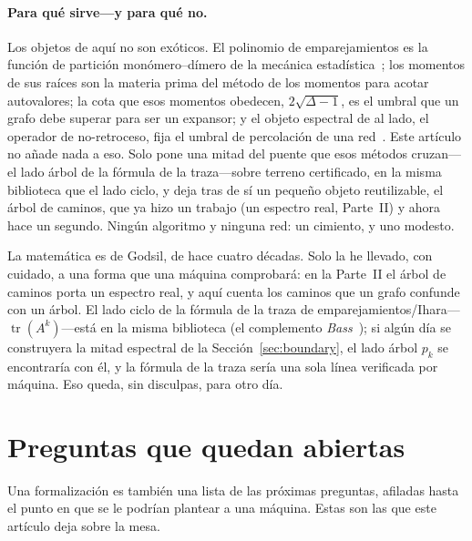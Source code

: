 \documentclass[11pt]{article}
\DeclareMathOperator{\tr}{tr}
\begin{document}
\paragraph{Para qu\'e sirve---y para qu\'e no.} Los objetos de aqu\'i no son ex\'oticos. El polinomio de
emparejamientos es la funci\'on de partici\'on mon\'omero--d\'imero de la mec\'anica
estad\'istica~\cite{HeilmannLieb}; los momentos de sus ra\'ices son la materia prima del m\'etodo de los
momentos para acotar autovalores; la cota que esos momentos obedecen, $2\sqrt{\Delta-1}$, es el umbral
que un grafo debe superar para ser un expansor; y el objeto espectral de al lado, el operador de
no-retroceso, fija el umbral de percolaci\'on de una red~\cite{Hashimoto,Bass}. Este art\'iculo no
a\~nade nada a eso. Solo pone una mitad del puente que esos m\'etodos cruzan---el lado \'arbol de la
f\'ormula de la traza---sobre terreno certificado, en la misma biblioteca que el lado ciclo, y deja tras
de s\'i un peque\~no objeto reutilizable, el \'arbol de caminos, que ya hizo un trabajo (un espectro
real, Parte~II) y ahora hace un segundo. Ning\'un algoritmo y ninguna red: un cimiento, y uno modesto.

La matem\'atica es de Godsil, de hace cuatro d\'ecadas. Solo la he llevado, con cuidado, a una forma que
una m\'aquina comprobar\'a: en la Parte~II el \'arbol de caminos porta un espectro real, y aqu\'i cuenta
los caminos que un grafo confunde con un \'arbol. El lado ciclo de la f\'ormula de la traza de
emparejamientos/Ihara---$\tr(A^k)$---est\'a en la misma biblioteca (el complemento \emph{Bass}~\cite{Bass});
si alg\'un d\'ia se construyera la mitad espectral de la Secci\'on~\ref{sec:boundary}, el lado \'arbol
$p_k$ se encontrar\'ia con \'el, y la f\'ormula de la traza ser\'ia una sola l\'inea verificada por
m\'aquina. Eso queda, sin disculpas, para otro d\'ia.

\section{Preguntas que quedan abiertas}
\label{sec:questions}

Una formalizaci\'on es tambi\'en una lista de las pr\'oximas preguntas, afiladas hasta el punto en que se
le podr\'ian plantear a una m\'aquina. Estas son las que este art\'iculo deja sobre la mesa.
\end{document}

